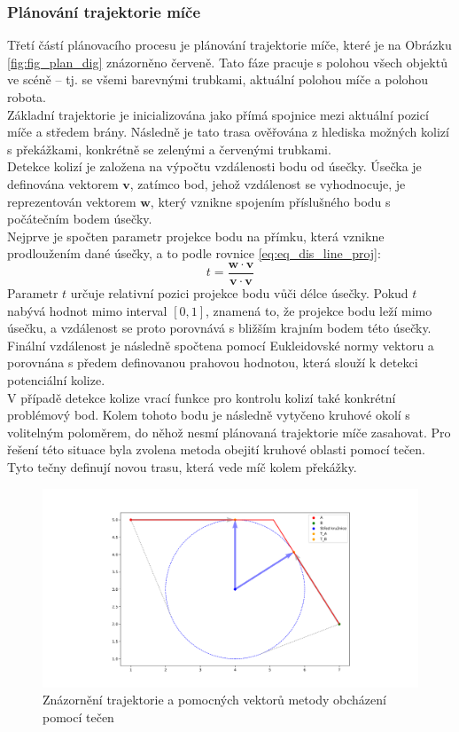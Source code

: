 \documentclass[a4paper,12pt]{article}
\begin{document}
\subsubsection{Plánování trajektorie míče}
Třetí částí plánovacího procesu je plánování trajektorie míče, které je na Obrázku \ref{fig:fig_plan_dig} znázorněno červeně. Tato fáze pracuje s polohou všech objektů ve scéně – tj. se všemi barevnými trubkami, aktuální polohou míče a polohou robota.\\
Základní trajektorie je inicializována jako přímá spojnice mezi aktuální pozicí míče a středem brány. Následně je tato trasa ověřována z hlediska možných kolizí s překážkami, konkrétně se zelenými a červenými trubkami.\\
Detekce kolizí je založena na výpočtu vzdálenosti bodu od úsečky. Úsečka je definována vektorem $\mathbf{v}$, zatímco bod, jehož vzdálenost se vyhodnocuje, je reprezentován vektorem $\mathbf{w}$, který vznikne spojením příslušného bodu s počátečním bodem úsečky.\\
Nejprve je spočten parametr projekce bodu na přímku, která vznikne prodloužením dané úsečky, a to podle rovnice \ref{eq:eq_dis_line_proj}:
\begin{equation}
	t = \frac{\mathbf{w}\cdot\mathbf{v}}{\mathbf{v}\cdot\mathbf{v}}
	\label{eq:eq_dis_line_proj}
\end{equation}
Parametr $t$ určuje relativní pozici projekce bodu vůči délce úsečky. Pokud $t$ nabývá hodnot mimo interval $[0, 1]$, znamená to, že projekce bodu leží mimo úsečku, a vzdálenost se proto porovnává s bližším krajním bodem této úsečky.\\
Finální vzdálenost je následně spočtena pomocí Eukleidovské normy vektoru a porovnána s předem definovanou prahovou hodnotou, která slouží k detekci potenciální kolize.\\
V případě detekce kolize vrací funkce pro kontrolu kolizí také konkrétní problémový bod. Kolem tohoto bodu je následně vytyčeno kruhové okolí s volitelným poloměrem, do něhož nesmí plánovaná trajektorie míče zasahovat. Pro řešení této situace byla zvolena metoda obejití kruhové oblasti pomocí tečen. Tyto tečny definují novou trasu, která vede míč kolem překážky.\\

\begin{figure}
	\centering
	\includegraphics[width=\linewidth]{pictures/tangent_test-eps-converted-to.pdf}
	\caption{Znázornění trajektorie a pomocných vektorů metody obcházení pomocí tečen}
	\label{fig:fig_tangent}
\end{figure}
\end{document}
